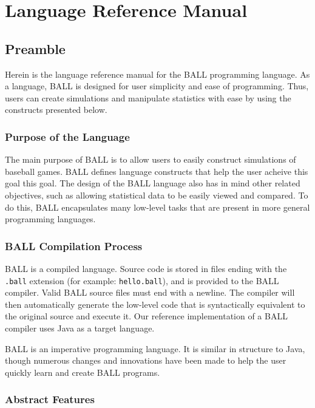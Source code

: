 
\chapter{Language Reference Manual}\label{refman}

\section{Preamble}
Herein is the language reference manual for the BALL programming
language. As a language, BALL is designed for user simplicity and ease
of programming. Thus, users can create simulations and manipulate
statistics with ease by using the constructs presented below.

\subsection{Purpose of the Language}
The main purpose of BALL is to allow users to easily construct
simulations of baseball games. BALL defines language constructs that
help the user acheive this goal this goal. The design of the BALL
language also has in mind other related objectives, such as allowing
statistical data to be easily viewed and compared. To do this, BALL
encapsulates many low-level tasks that are present in more general
programming languages.

\subsection{BALL Compilation Process}\label{ref_compile}
BALL is a compiled language. Source code is stored in files ending
with the \texttt{.ball} extension (for example: \texttt{hello.ball}),
and is provided to the BALL compiler. Valid BALL source files must end
with a newline. The compiler will then automatically generate the
low-level code that is syntactically equivalent to the original source
and execute it. Our reference implementation of a BALL compiler uses
Java as a target language.

BALL is an imperative programming language. It is similar in structure
to Java, though numerous changes and innovations have been made to
help the user quickly learn and create BALL programs.

\subsection{Abstract Features}
